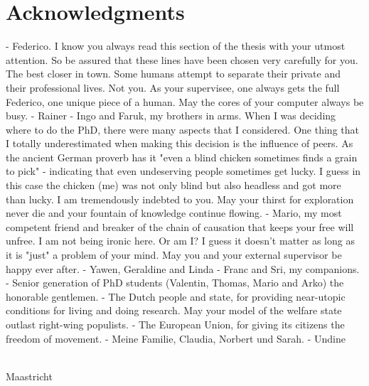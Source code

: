 \chapter{Acknowledgments}
- Federico. I know you always read this section of the thesis with your utmost attention. So be assured that these lines have been chosen very carefully for you. The best closer in town. Some humans attempt to separate their private and their professional lives. Not you. As your supervisee, one always gets the full Federico, one unique piece of a human. May the cores of your computer always be busy.
- Rainer
- Ingo and Faruk, my brothers in arms. When I was deciding where to do the PhD, there were many aspects that I considered. One thing that I totally underestimated when making this decision is the influence of peers. As the ancient German proverb has it "even a blind chicken sometimes finds a grain to pick" - indicating that even undeserving people sometimes get lucky. I guess in this case the chicken (me) was not only blind but also headless and got more than lucky. I am tremendously indebted to you. May your thirst for exploration never die and your fountain of knowledge continue flowing.
- Mario, my most competent friend and breaker of the chain of causation that keeps your free will unfree. I am not being ironic here. Or am I? I guess it doesn't matter as long as it is "just" a problem of your mind. May you and your external supervisor be happy ever after.
- Yawen, Geraldine and Linda
- Franc and Sri, my companions.
- Senior generation of PhD students (Valentin, Thomas, Mario and Arko) the honorable gentlemen.
- The Dutch people and state, for providing near-utopic conditions for living and doing research. May your model of the welfare state outlast right-wing populists.
- The European Union, for giving its citizens the freedom of movement.
- Meine Familie, Claudia, Norbert und Sarah.
- Undine

{\flushright \thesisauthor \\ Maastricht \\ \thesisdate \\ }